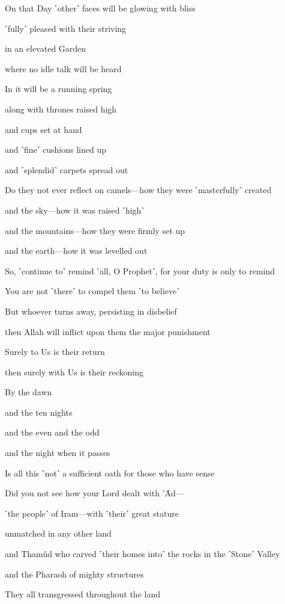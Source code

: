 On that Day ˹other˺ faces will be glowing with bliss

˹fully˺ pleased with their striving

in an elevated Garden

where no idle talk will be heard

In it will be a running spring

along with thrones raised high

and cups set at hand

and ˹fine˺ cushions lined up

and ˹splendid˺ carpets spread out

Do they not ever reflect on camels—how they were ˹masterfully˺ created

and the sky—how it was raised ˹high˺

and the mountains—how they were firmly set up

and the earth—how it was levelled out

So, ˹continue to˺ remind ˹all, O Prophet˺, for your duty is only to remind

You are not ˹there˺ to compel them ˹to believe˺

But whoever turns away, persisting in disbelief

then Allah will inflict upon them the major punishment

Surely to Us is their return

then surely with Us is their reckoning

By the dawn

and the ten nights

and the even and the odd

and the night when it passes

Is all this ˹not˺ a sufficient oath for those who have sense

Did you not see how your Lord dealt with ’Ȃd—

˹the people˺ of Iram—with ˹their˺ great stature

unmatched in any other land

and Thamûd who carved ˹their homes into˺ the rocks in the ˹Stone˺ Valley

and the Pharaoh of mighty structures

They all transgressed throughout the land

